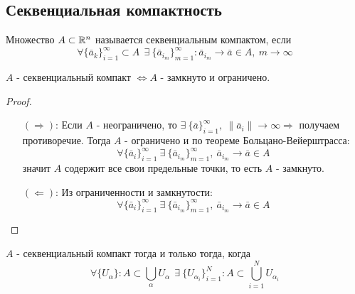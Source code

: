 \subsection{Секвенциальная компактность}
\begin{definition}
    Множество $A\subset \mathbb{R}^n$ называется секвенциальным компактом, если 
    \[\forall \{\bar{a}_k\}_{i=1}^{\infty}\subset A\ \ \exists\ \{\bar{a}_{i_m}\}_{m=1}^{\infty}: \bar{a}_{i_m}\to \bar{a} \in A,\ m\to \infty\]
\end{definition}  
\begin{theorem}
    $A$ - секвенциальный компакт $\Leftrightarrow A$ - замкнуто и ограничено. 
\end{theorem}
\begin{proof}\tab
    \begin{itemize}
        \item[$(\Rightarrow)$:] Если $A$ - неограничено, то $\exists\ \{\bar{a}\}_{i=1}^{\infty},\ \|\bar{a}_i\|\to \infty \Rightarrow$ получаем противоречие.
        Тогда $A$ - ограничено и по теореме Больцано-Вейерштрасса:
        \[\forall \{\bar{a}_i\}_{i=1}^{\infty}\ \exists\ \{\bar{a}_{i_m}\}_{m=1}^{\infty},\ \bar{a}_{i_m} \to \bar{a}\in A\]
        значит $A$ содержит все свои предельные точки, то есть $A$ - замкнуто.
        \item[$(\Leftarrow)$:] Из ограниченности и замкнутости:
        \[\forall \{\bar{a}_i\}_{i=1}^{\infty}\ \exists\ \{\bar{a}_{i_m}\}_{m=1}^{\infty},\ \bar{a}_{i_m} \to \bar{a}\in A\]
    \end{itemize}
\end{proof} 
\begin{theorem}
    $A$ - секвенциальный компакт тогда и только тогда, когда
    \[\forall \{U_{\alpha}\}: A\subset \bigcup_{\alpha}U_{\alpha}\ \ \exists\ \{U_{\alpha_i}\}_{i=1}^N: A\subset \bigcup_{i=1}^N U_{\alpha_i}\]
\end{theorem} 

